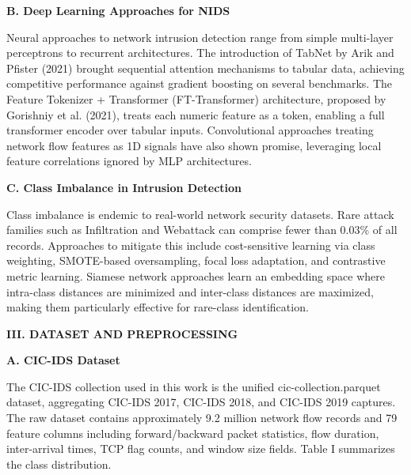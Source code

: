 \documentclass[
  journal,
  10pt]{IEEEtran}
\begin{document}
\textbf{B. Deep Learning Approaches for NIDS}

Neural approaches to network intrusion detection range from simple
multi-layer perceptrons to recurrent architectures. The introduction of
TabNet by Arik and Pfister (2021) brought sequential attention
mechanisms to tabular data, achieving competitive performance against
gradient boosting on several benchmarks. The Feature Tokenizer +
Transformer (FT-Transformer) architecture, proposed by Gorishniy et al.
(2021), treats each numeric feature as a token, enabling a full
transformer encoder over tabular inputs. Convolutional approaches
treating network flow features as 1D signals have also shown promise,
leveraging local feature correlations ignored by MLP architectures.

\textbf{C. Class Imbalance in Intrusion Detection}

Class imbalance is endemic to real-world network security datasets. Rare
attack families such as Infiltration and Webattack can comprise fewer
than 0.03\% of all records. Approaches to mitigate this include
cost-sensitive learning via class weighting, SMOTE-based oversampling,
focal loss adaptation, and contrastive metric learning. Siamese network
approaches learn an embedding space where intra-class distances are
minimized and inter-class distances are maximized, making them
particularly effective for rare-class identification.

\textbf{III. DATASET AND PREPROCESSING}

\textbf{A. CIC-IDS Dataset}

The CIC-IDS collection used in this work is the unified
cic-collection.parquet dataset, aggregating CIC-IDS 2017, CIC-IDS 2018,
and CIC-IDS 2019 captures. The raw dataset contains approximately 9.2
million network flow records and 79 feature columns including
forward/backward packet statistics, flow duration, inter-arrival times,
TCP flag counts, and window size fields. Table I summarizes the class
distribution.
\end{document}
